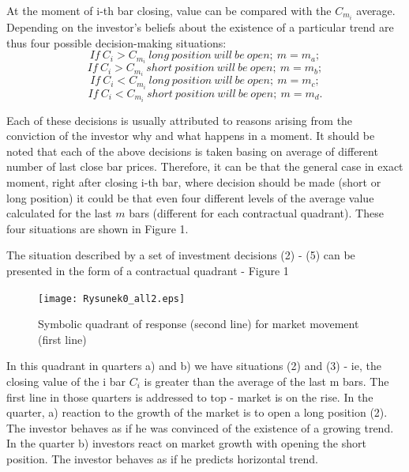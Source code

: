 At the moment of i-th bar closing, value can be compared with the $C_{m_{i}}$ average. Depending on the investor's beliefs about the existence of a particular trend are thus four possible decision-making situations:
\begin{equation} If\ C_i  > C_{m_{i}}\   long\ position\ will\ be\ open;\ m=m_a; \end{equation}
\begin{equation} If\ C_i  > C_{m_{i}}\   short\ position\ will\ be\ open;\ m=m_b; \end{equation}
\begin{equation} If\ C_i  < C_{m_{i}}\   long\ position\ will\ be\ open;\ m=m_c; \end{equation}
\begin{equation} If\ C_i  < C_{m_{i}}\   short\ position\ will\ be\ open;\ m=m_d. \end{equation}

Each of these decisions is usually attributed to reasons arising from the conviction of the investor why and what happens in a moment. It should be noted that each of the above decisions is taken basing on average of different number of last close bar prices. Therefore, it can be that the general case in exact moment, right after closing i-th bar, where decision should be made (short or long position) it could be that even four different levels of  the average value calculated for the last $m$ bars (different for each contractual quadrant). These four situations are shown in Figure 1.

The situation described by a set of investment decisions (2) - (5) can be presented in the form of a contractual quadrant - Figure 1


\begin{figure}[h!]
 \centering
 \texttt{[image: Rysunek0\_all2.eps]}
 \caption{Symbolic quadrant of response (second line) for market movement (first line)}
\end{figure}
\FloatBarrier



In this quadrant in quarters a) and b) we have situations (2) and (3) - ie, the closing value of the i bar $C_i$ is greater than the average of the last m bars. The first line in those quarters is addressed to top - market is on the rise. In the quarter, a) reaction to the growth of the market is to open a long position (2). The investor behaves as if he was convinced of the existence of a growing trend. In the quarter b) investors react on market growth with opening the short position. The investor behaves as if he predicts horizontal trend.

